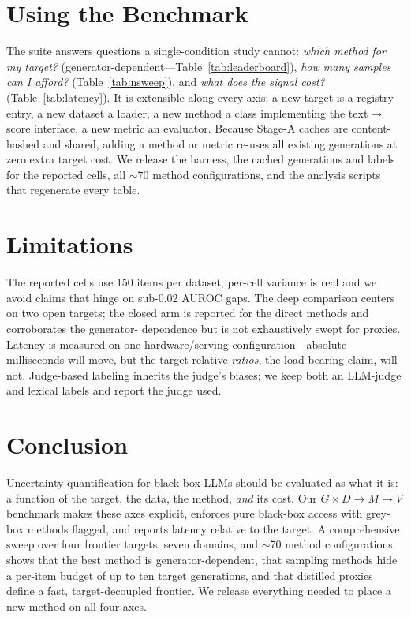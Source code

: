 \documentclass[11pt]{article}
\begin{document}
\section{Using the Benchmark}
The suite answers questions a single-condition study cannot: \emph{which method for my
target?} (generator-dependent---Table~\ref{tab:leaderboard}), \emph{how many samples can I
afford?} (Table~\ref{tab:nsweep}), and \emph{what does the signal cost?}
(Table~\ref{tab:latency}). It is extensible along every axis: a new target is a registry
entry, a new dataset a loader, a new method a class implementing the text$\to$score
interface, a new metric an evaluator. Because Stage-A caches are content-hashed and
shared, adding a method or metric re-uses all existing generations at zero extra target
cost. We release the harness, the cached generations and labels for the reported cells,
all $\sim$70 method configurations, and the analysis scripts that regenerate every table.

\section{Limitations}
The reported cells use 150 items per dataset; per-cell variance is real and we avoid
claims that hinge on sub-0.02 AUROC gaps. The deep comparison centers on two open targets;
the closed arm is reported for the direct methods and corroborates the generator-%
dependence but is not exhaustively swept for proxies. Latency is measured on one
hardware/serving configuration---absolute milliseconds will move, but the target-relative
\emph{ratios}, the load-bearing claim, will not. Judge-based labeling inherits the judge's
biases; we keep both an LLM-judge and lexical labels and report the judge used.

\section{Conclusion}
Uncertainty quantification for black-box LLMs should be evaluated as what it is: a
function of the target, the data, the method, \emph{and} its cost. Our $G\times D\to M\to
V$ benchmark makes these axes explicit, enforces pure black-box access with grey-box
methods flagged, and reports latency relative to the target. A comprehensive sweep over
four frontier targets, seven domains, and $\sim$70 method configurations shows that the
best method is generator-dependent, that sampling methods hide a per-item budget of up to
ten target generations, and that distilled proxies define a fast, target-decoupled
frontier. We release everything needed to place a new method on all four axes.
\end{document}
